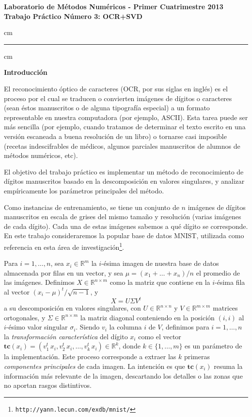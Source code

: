 \documentclass[11pt, a4paper]{article}
\newcommand{\real}{\mathbb{R}}
\begin{document}
\begin{centering}
\large\bf Laboratorio de M\'etodos Num\'ericos - Primer Cuatrimestre 2013 \\
\large\bf Trabajo Pr\'actico N\'umero 3: OCR+SVD\\
\end{centering}


 cm
\hrule
{} cm

{\bf Introducci\'on}

El reconocimiento \'optico de caracteres (OCR, por sus siglas en ingl\'es) es el proceso por el cual se traducen o convierten im\'agenes de d\'igitos o caracteres (sean \'estos manuscritos o de alguna tipograf\'ia especial) a un formato representable en nuestra computadora (por ejemplo, ASCII). Esta tarea puede ser m\'as sencilla (por ejemplo, cuando tratamos de determinar el texto escrito en una versi\'on escaneada a buena resoluci\'on de un libro) o tornarse casi imposible (recetas indescifrables de m\'edicos, algunos parciales manuscritos de alumnos de m\'etodos num\'ericos, etc).

El objetivo del trabajo pr\'actico es implementar un m\'etodo de reconocimiento de d\'igitos manuscritos basado en la descomposici\'on en valores singulares, y analizar emp\'iricamente los par\'ametros principales del m\'etodo.

Como instancias de entrenamiento, se tiene un conjunto de $n$ im\'agenes de d\'igitos ma\-nus\-cri\-tos en escala de grises del mismo tama\~no y resoluci\'on (varias im\'agenes de cada d\'igito). Cada una de estas im\'agenes sabemos a qu\'e d\'igito se corresponde.
En este trabajo consideraremos la popular base de datos MNIST, utilizada como referencia en esta \'area de investigaci\'on\footnote{\texttt{http://yann.lecun.com/exdb/mnist/}}. 

Para $i = 1,\ldots, n$, sea $x_i \in \real^{m}$ la $i$-\'esima imagen de nuestra base de datos almacenada por filas en un vector, y sea $\mu = (x_1 + \ldots + x_n)/n$ el promedio de las im\'agenes. Definimos $X\in\real^{n\times m}$ como la matriz que contiene en la $i$-\'esima fila al vector $(x_i - \mu)^{t}/\sqrt{n-1}$, y $$X=U \Sigma V^t$$ a su descomposici\'on en valores singulares, con $U\in\real^{n\times n}$ y $V\in\real^{m\times m}$ matrices ortogonales, y $\Sigma\in\real^{n\times m}$ la matriz diagonal conteniendo en la posici\'on $(i,i)$ al $i$-\'esimo valor singular $\sigma_i$.
Siendo $v_i$ la columna $i$ de $V$, definimos para $i = 1,\ldots,n$ la \textsl{transformaci\'on caracter\'istica} del d\'igito $x_{i}$ como el vector $\mathbf{tc}(x_i) = (v_1^t\, x_i, v_2^t\, x_i,\ldots,v_k^t\, x_i) \in\real^k$, donde $k \in\{1,\ldots,m\}$ es un par\'ametro de la implementaci\'on. Este proceso corresponde a extraer las $k$ primeras \textit{componentes principales} de cada imagen. La intenci\'on es que $\mathbf{tc}(x_i)$ resuma la informaci\'on m\'as relevante de la imagen, descartando los detalles o las zonas que no aportan rasgos distintivos.
\end{document}
